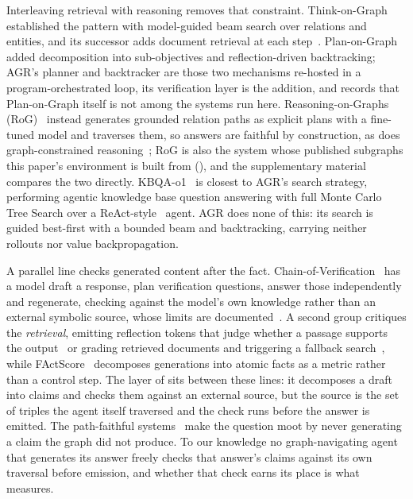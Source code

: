 Interleaving retrieval with reasoning removes that constraint.
Think-on-Graph~\cite{sun2024think} established the pattern with
model-guided beam search over relations and entities, and its successor
adds document retrieval at each step~\cite{ma2024tog2}.
Plan-on-Graph~\cite{chen2024plan} added decomposition into
sub-objectives and reflection-driven backtracking; AGR's planner and
backtracker are those two mechanisms re-hosted in a program-orchestrated
loop, its verification layer is the addition, and
 records that Plan-on-Graph itself is not
among the systems run here. Reasoning-on-Graphs
(RoG)~\cite{luo2024reasoning} instead generates grounded relation paths
as explicit plans with a fine-tuned model and traverses them, so answers
are faithful by construction, as does graph-constrained
reasoning~\cite{luo2025gcr}; RoG is also the system whose published
subgraphs this paper's environment is built from
(), and the supplementary material compares the
two directly. KBQA-o1~\cite{luo2025kbqao1} is closest to AGR's search
strategy, performing agentic knowledge base question answering with full
Monte Carlo Tree Search over a ReAct-style~\cite{yao2023react} agent.
AGR does none of this: its search is guided best-first with a bounded
beam and backtracking, carrying neither rollouts nor value
backpropagation.

A parallel line checks generated content after the fact.
Chain-of-Verification~\cite{dhuliawala2024chain} has a model draft a
response, plan verification questions, answer those independently and
regenerate, checking against the model's own knowledge rather than an
external symbolic source, whose limits are
documented~\cite{huang2024selfcorrect}. A second group critiques the
\emph{retrieval}, emitting reflection tokens that judge whether a
passage supports the output~\cite{asai2024selfrag} or grading retrieved
documents and triggering a fallback search~\cite{yan2024crag}, while
FActScore~\cite{min2023factscore} decomposes generations into atomic
facts as a metric rather than a control step. The layer of
 sits between these lines: it decomposes a draft
into claims and checks them against an external source, but the source
is the set of triples the agent itself traversed and the check runs
before the answer is emitted. The path-faithful
systems~\cite{luo2024reasoning,luo2025gcr} make the question moot by
never generating a claim the graph did not produce. To our knowledge no
graph-navigating agent that generates its answer freely checks that
answer's claims against its own traversal before emission, and whether
that check earns its place is what  measures.

